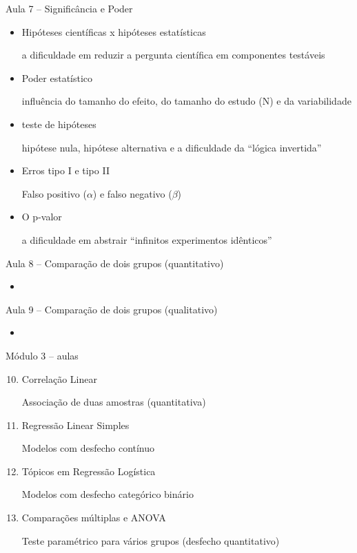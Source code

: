 \documentclass{beamer}
\begin{document}
\begin{frame}{\scriptsize Aula 7 -- Significância e Poder}
  \begin{itemize}
    \footnotesize
  \item Hipóteses científicas x hipóteses estatísticas

    {\tiny a dificuldade em reduzir a pergunta científica em componentes testáveis}
    \bigskip
  \item Poder estatístico

    {\tiny influência do tamanho do efeito, do tamanho do estudo (N) e da variabilidade}
    \bigskip
  \item teste de hipóteses

    {\tiny hipótese nula, hipótese alternativa e a dificuldade da ``lógica invertida''}
    \bigskip
  \item Erros tipo I e tipo II

    {\tiny Falso positivo ($\alpha$) e falso negativo ($\beta$)}
    \bigskip
  \item O p-valor

    {\tiny a dificuldade em abstrair ``infinitos experimentos idênticos''}
  \end{itemize}
\end{frame}

\begin{frame}{\scriptsize Aula 8 -- Comparação de dois grupos (quantitativo)}
  \begin{itemize}
  \item 
  \end{itemize}
\end{frame}

\begin{frame}{\scriptsize Aula 9 -- Comparação de dois grupos (qualitativo)}
  \begin{itemize}
  \item 
  \end{itemize}
\end{frame}

\begin{frame}{\scriptsize Módulo 3 -- aulas}
  \begin{enumerate}
    \setcounter{enumi}{9}
  \item Correlação Linear

    {\tiny Associação de duas amostras (quantitativa)}
    \bigskip
  \item Regressão Linear Simples

    {\tiny Modelos com desfecho contínuo}
    \bigskip
  \item Tópicos em Regressão Logística

    {\tiny Modelos com desfecho categórico binário}
    \bigskip
  \item Comparações múltiplas e ANOVA

    {\tiny Teste paramétrico para vários grupos (desfecho quantitativo)}
  \end{enumerate}
\end{frame}
\end{document}
